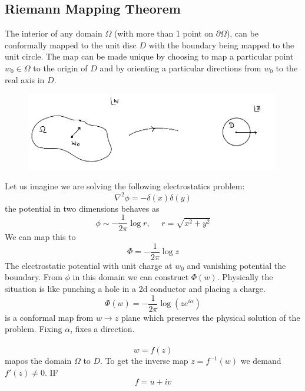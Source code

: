 \documentclass[a4paper,12pt]{article}
\begin{document}
\subsection{Riemann Mapping Theorem}
The interior of any domain $\Omega$ (with more than 1 point on $\partial\Omega$), can be conformally mapped to the unit disc $D$ with the boundary being mapped to the unit circle. The map can be made unique by choosing to map a particular point $w_0\in \Omega$ to the origin of $D$ and by orienting a particular directions from $w_0$ to the real axis in $D$.
\begin{figure}[H]
	\centering
	\includegraphics[width=0.7\linewidth]{3}
	\caption{}
	\label{fig:3}
\end{figure}
Let us imagine we are solving the following electrostatics problem:
\begin{equation}
\nabla^2\phi =-\delta(x)\delta(y)
\end{equation}
the potential in two dimensions behaves as
\begin{equation}
\phi\sim -\frac{1}{2\pi}\log r,~~~~~~r=\sqrt{x^2+y^2}
\end{equation}
We can map this to
\begin{equation}
	\Phi= -\frac{1}{2\pi}\log z
\end{equation}
The electrostatic potential with unit charge at $w_0$ and vanishing potential the boundary. From  $\phi$ in this domain we can construct $\Phi(w)$. Physically the situation is like punching a hole in a 2d conductor and placing a charge.
\begin{equation}
\Phi(w)=-\frac{1}{2\pi}\log (ze^{i\alpha})
\end{equation} 
is a conformal map from $w\to z$ plane which preserves the physical solution of the problem. Fixing $\alpha$, fixes a direction.\\\\
\begin{equation}
w=f(z)
\end{equation}
mapos the domain $\Omega$ to $D$. To get the inverse map $z=f^{-1}(w)$ we demand $f'(z)\neq 0$. IF
\begin{equation}
f=u+iv
\end{equation}
\end{document}
